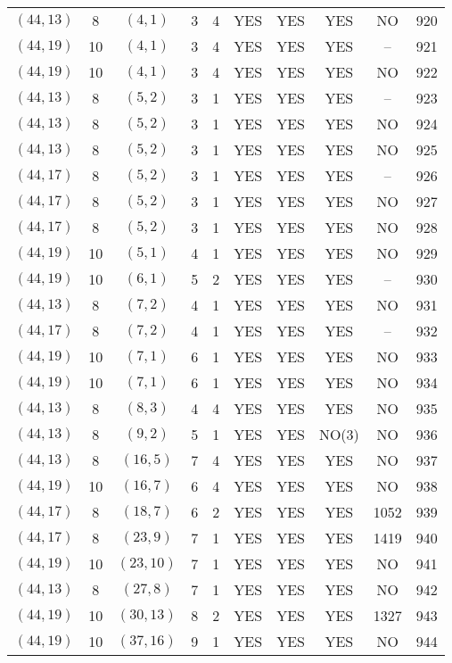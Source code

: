 \begin{longtable}{|c|c|c|c|c|c|c|c|c|c|}
$(44, 13)$ & 8 & $(4, 1)$ & 3 & 4 & YES & YES & YES & NO & 920\\
$(44, 19)$ & 10 & $(4, 1)$ & 3 & 4 & YES & YES & YES & -- & 921\\
$(44, 19)$ & 10 & $(4, 1)$ & 3 & 4 & YES & YES & YES & NO & 922\\
$(44, 13)$ & 8 & $(5, 2)$ & 3 & 1 & YES & YES & YES & -- & 923\\
$(44, 13)$ & 8 & $(5, 2)$ & 3 & 1 & YES & YES & YES & NO & 924\\
$(44, 13)$ & 8 & $(5, 2)$ & 3 & 1 & YES & YES & YES & NO & 925\\
$(44, 17)$ & 8 & $(5, 2)$ & 3 & 1 & YES & YES & YES & -- & 926\\
$(44, 17)$ & 8 & $(5, 2)$ & 3 & 1 & YES & YES & YES & NO & 927\\
$(44, 17)$ & 8 & $(5, 2)$ & 3 & 1 & YES & YES & YES & NO & 928\\
$(44, 19)$ & 10 & $(5, 1)$ & 4 & 1 & YES & YES & YES & NO & 929\\
$(44, 19)$ & 10 & $(6, 1)$ & 5 & 2 & YES & YES & YES & -- & 930\\
$(44, 13)$ & 8 & $(7, 2)$ & 4 & 1 & YES & YES & YES & NO & 931\\
$(44, 17)$ & 8 & $(7, 2)$ & 4 & 1 & YES & YES & YES & -- & 932\\
$(44, 19)$ & 10 & $(7, 1)$ & 6 & 1 & YES & YES & YES & NO & 933\\
$(44, 19)$ & 10 & $(7, 1)$ & 6 & 1 & YES & YES & YES & NO & 934\\
$(44, 13)$ & 8 & $(8, 3)$ & 4 & 4 & YES & YES & YES & NO & 935\\
$(44, 13)$ & 8 & $(9, 2)$ & 5 & 1 & YES & YES & NO(3) & NO & 936\\
$(44, 13)$ & 8 & $(16, 5)$ & 7 & 4 & YES & YES & YES & NO & 937\\
$(44, 19)$ & 10 & $(16, 7)$ & 6 & 4 & YES & YES & YES & NO & 938\\
$(44, 17)$ & 8 & $(18, 7)$ & 6 & 2 & YES & YES & YES & 1052 & 939\\
$(44, 17)$ & 8 & $(23, 9)$ & 7 & 1 & YES & YES & YES & 1419 & 940\\
$(44, 19)$ & 10 & $(23, 10)$ & 7 & 1 & YES & YES & YES & NO & 941\\
$(44, 13)$ & 8 & $(27, 8)$ & 7 & 1 & YES & YES & YES & NO & 942\\
$(44, 19)$ & 10 & $(30, 13)$ & 8 & 2 & YES & YES & YES & 1327 & 943\\
$(44, 19)$ & 10 & $(37, 16)$ & 9 & 1 & YES & YES & YES & NO & 944\\

\end{longtable}
